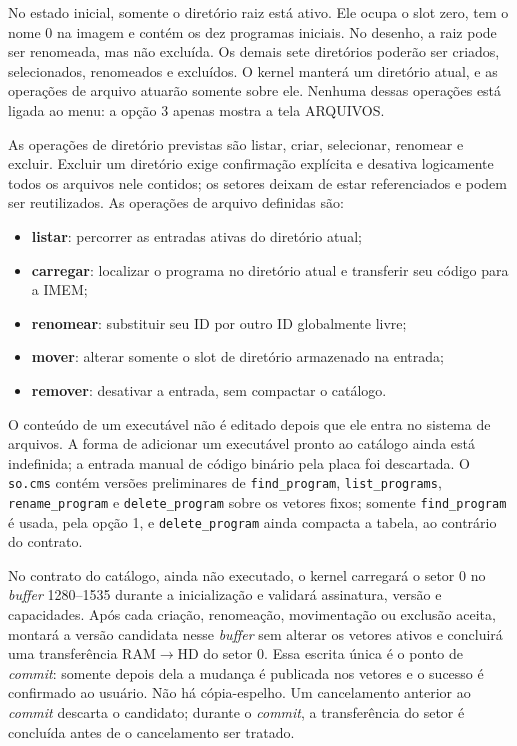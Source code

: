 \documentclass[
    12pt,
    openright,
    a4paper,
    english,
    brazilian
]{abntex2}
\begin{document}
No estado inicial, somente o diretório raiz está ativo. Ele ocupa o slot zero, tem o nome 0 na imagem e contém os dez programas iniciais. No desenho, a raiz pode ser renomeada, mas não excluída. Os demais sete diretórios poderão ser criados, selecionados, renomeados e excluídos. O kernel manterá um diretório atual, e as operações de arquivo atuarão somente sobre ele. Nenhuma dessas operações está ligada ao menu: a opção 3 apenas mostra a tela ARQUIVOS.

As operações de diretório previstas são listar, criar, selecionar, renomear e excluir. Excluir um diretório exige confirmação explícita e desativa logicamente todos os arquivos nele contidos; os setores deixam de estar referenciados e podem ser reutilizados. As operações de arquivo definidas são:

\begin{itemize}
    \item \textbf{listar}: percorrer as entradas ativas do diretório atual;
    \item \textbf{carregar}: localizar o programa no diretório atual e transferir seu código para a IMEM;
    \item \textbf{renomear}: substituir seu ID por outro ID globalmente livre;
    \item \textbf{mover}: alterar somente o slot de diretório armazenado na entrada;
    \item \textbf{remover}: desativar a entrada, sem compactar o catálogo.
\end{itemize}

O conteúdo de um executável não é editado depois que ele entra no sistema de arquivos. A forma de adicionar um executável pronto ao catálogo ainda está indefinida; a entrada manual de código binário pela placa foi descartada. O \texttt{so.cms} contém versões preliminares de \texttt{find\_program}, \texttt{list\_programs}, \texttt{rename\_program} e \texttt{delete\_program} sobre os vetores fixos; somente \texttt{find\_program} é usada, pela opção 1, e \texttt{delete\_program} ainda compacta a tabela, ao contrário do contrato.

No contrato do catálogo, ainda não executado, o kernel carregará o setor 0 no \emph{buffer} 1280--1535 durante a inicialização e validará assinatura, versão e capacidades. Após cada criação, renomeação, movimentação ou exclusão aceita, montará a versão candidata nesse \emph{buffer} sem alterar os vetores ativos e concluirá uma transferência RAM$\rightarrow$HD do setor 0. Essa escrita única é o ponto de \emph{commit}: somente depois dela a mudança é publicada nos vetores e o sucesso é confirmado ao usuário. Não há cópia-espelho. Um cancelamento anterior ao \emph{commit} descarta o candidato; durante o \emph{commit}, a transferência do setor é concluída antes de o cancelamento ser tratado.
\end{document}

